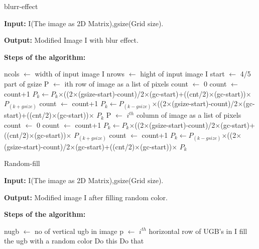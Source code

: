 \documentclass[12pt]{article}
\begin{document}
\begin{algorithm}[htp]
\caption{blurr-effect}
\textbf{Input:} I(The image as 2D Matrix),gsize(Grid size).\par 
\textbf{Output:} Modified Image I with blur effect.\par
\textbf{Steps of the algorithm:}
\begin{algorithmic}[1]
\STATE ncols $\longleftarrow$ width of input image I
\STATE nrows $\longleftarrow$ hight of input image I
\STATE start $\longleftarrow$ 4/5 part of gsize
	\STATE P $\longleftarrow$ ith row of image as a list of pixels
		\STATE count $\longleftarrow$ 0
			\STATE count $\longleftarrow$ count+1
			\STATE $P_k$$\longleftarrow$$P_k$$\times$((2$\times$(gsize-start)-count)/2$\times$(gc-start)+((cnt/2)$\times$(gc-start))$\times$ $P_{(k+gsize)}$
		\ENDFOR
			\STATE count $\longleftarrow$ count+1
			\STATE $P_{k}$$\longleftarrow$$P_{(k-gsize)}$$\times$((2$\times$(gsize-start)-count)/2$\times$(gc-start)+((cnt/2)$\times$(gc-start))$\times$ $P_{k}$
		\ENDFOR
   \ENDIF
\ENDFOR
{}
	\STATE P $\longleftarrow$ $i^{th}$ column of image as a list of pixels
		\STATE count $\longleftarrow$ 0
			\STATE count $\longleftarrow$ count+1
			\STATE $P_k$$\longleftarrow$$P_k$$\times$((2$\times$(gsize-start)-count)/2$\times$(gc-start)+((cnt/2)$\times$(gc-start))$\times$ $P_{(k+gsize)}$
		\ENDFOR
			\STATE count $\longleftarrow$ count+1
			\STATE $P_{k}$$\longleftarrow$$P_{(k-gsize)}$$\times$((2$\times$(gsize-start)-count)/2$\times$(gc-start)+((cnt/2)$\times$(gc-start))$\times$ $P_{k}$
		\ENDFOR
   \ENDIF
\ENDFOR
\end{algorithmic}
\label{Algorithm:2}
\end{algorithm}

\begin{algorithm}[htp]
\caption{Random-fill}
\textbf{Input:} I(The image as 2D Matrix),gsize(Grid size).\par
\textbf{Output:} Modified image I after filling random color.\par
\textbf{Steps of the algorithm:}
\begin{algorithmic}[1]
\STATE nugb $\longleftarrow$ no of vertical ugb in image
    \STATE p $\longleftarrow$ $i^{th}$ horizontal row of UGB's in I
    			\STATE fill the ugb with a random color
    		\ENDIF
	\ENDFOR
\ENDFOR
{}
    \STATE Do this
\ELSE
    \STATE Do that
\ENDIF
\end{algorithmic}
\label{Algorithm:2}
\end{algorithm}
\newpage
\end{document}
